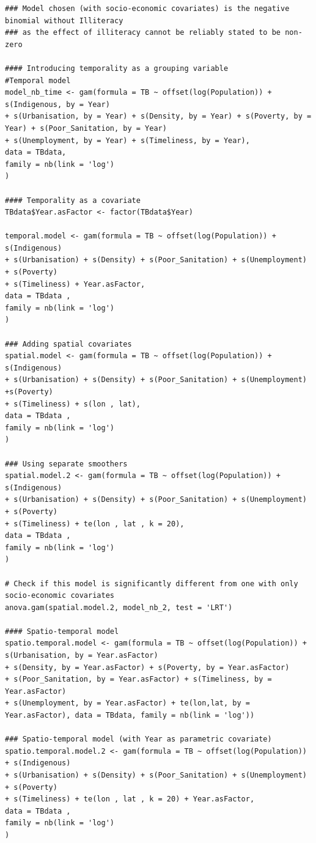 \begin{verbatim}
### Model chosen (with socio-economic covariates) is the negative binomial without Illiteracy
### as the effect of illiteracy cannot be reliably stated to be non-zero

#### Introducing temporality as a grouping variable
#Temporal model
model_nb_time <- gam(formula = TB ~ offset(log(Population)) + s(Indigenous, by = Year) 
+ s(Urbanisation, by = Year) + s(Density, by = Year) + s(Poverty, by = Year) + s(Poor_Sanitation, by = Year) 
+ s(Unemployment, by = Year) + s(Timeliness, by = Year), 
data = TBdata, 
family = nb(link = 'log')
)

#### Temporality as a covariate
TBdata$Year.asFactor <- factor(TBdata$Year)

temporal.model <- gam(formula = TB ~ offset(log(Population)) + s(Indigenous)
+ s(Urbanisation) + s(Density) + s(Poor_Sanitation) + s(Unemployment) + s(Poverty)
+ s(Timeliness) + Year.asFactor,
data = TBdata ,
family = nb(link = 'log')
)

### Adding spatial covariates
spatial.model <- gam(formula = TB ~ offset(log(Population)) + s(Indigenous) 
+ s(Urbanisation) + s(Density) + s(Poor_Sanitation) + s(Unemployment) +s(Poverty)
+ s(Timeliness) + s(lon , lat),
data = TBdata , 
family = nb(link = 'log')
)

### Using separate smoothers
spatial.model.2 <- gam(formula = TB ~ offset(log(Population)) + s(Indigenous) 
+ s(Urbanisation) + s(Density) + s(Poor_Sanitation) + s(Unemployment) + s(Poverty)
+ s(Timeliness) + te(lon , lat , k = 20),
data = TBdata , 
family = nb(link = 'log')
)

# Check if this model is significantly different from one with only socio-economic covariates
anova.gam(spatial.model.2, model_nb_2, test = 'LRT')

#### Spatio-temporal model
spatio.temporal.model <- gam(formula = TB ~ offset(log(Population)) + s(Urbanisation, by = Year.asFactor) 
+ s(Density, by = Year.asFactor) + s(Poverty, by = Year.asFactor) 
+ s(Poor_Sanitation, by = Year.asFactor) + s(Timeliness, by = Year.asFactor) 
+ s(Unemployment, by = Year.asFactor) + te(lon,lat, by = Year.asFactor), data = TBdata, family = nb(link = 'log'))

### Spatio-temporal model (with Year as parametric covariate)
spatio.temporal.model.2 <- gam(formula = TB ~ offset(log(Population)) + s(Indigenous) 
+ s(Urbanisation) + s(Density) + s(Poor_Sanitation) + s(Unemployment) + s(Poverty)
+ s(Timeliness) + te(lon , lat , k = 20) + Year.asFactor,
data = TBdata , 
family = nb(link = 'log')
)
\end{verbatim}


